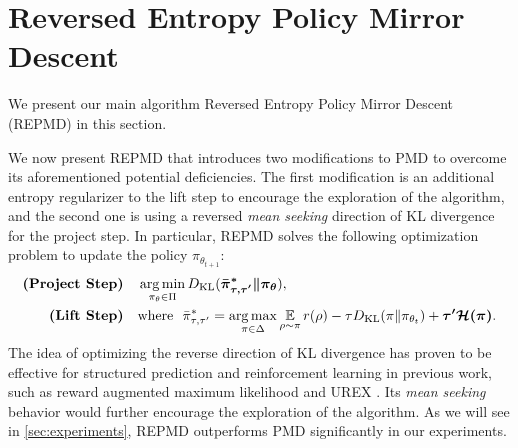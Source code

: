 




\section{Reversed Entropy Policy Mirror Descent}
\label{subsec:repmd}

We present our main algorithm Reversed Entropy Policy Mirror Descent (REPMD) in this section. 


We now present REPMD that introduces two modifications to PMD to overcome its aforementioned potential deficiencies.
The first modification is an additional entropy regularizer to the lift step to encourage the exploration of the algorithm, 
and the second one is using a reversed \emph{mean seeking} direction of KL divergence for the project step.
In particular, REPMD solves the following optimization problem to update the policy $\pi_{\theta_{t+1}}$:
\begin{equation}
\label{eq:repmd}
\begin{split}
\text{\bf (Project Step)} \quad  &\argmin\limits_{\pi_\theta \in \Pi}{\KL(\bm{ \bar{\pi}_{\tau,\tau^{\prime}}^* \| \pi_\theta }) }, \\
\text{\bf (Lift Step)} \quad  & \text{where}\ \ \bar{\pi}_{\tau,\tau^{\prime}}^*  =  \argmax\limits_{\pi \in \Delta}{ \ep\limits_{\rho \sim \pi}{  r(\rho)  - \tau \KL(\pi \| \pi_{\theta_t}) + \bm{\tau^{\prime} \cH(\pi)} }}.
\end{split}
\end{equation}
The idea of optimizing the reverse direction of KL divergence has proven to be effective for structured prediction and reinforcement learning in previous work, such as reward augmented maximum likelihood \citep{norouzi2016reward} and UREX \citep{nachum2017improving}.
Its \emph{mean seeking} behavior would further encourage the exploration of the algorithm.
As we will see in \cref{sec:experiments}, REPMD outperforms PMD significantly in our experiments. 

